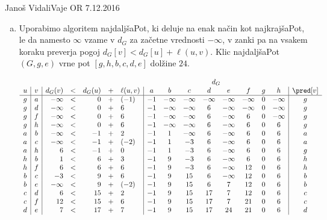 \begin{naloga}{Janoš Vidali}{Vaje OR 7.12.2016}
\begin{odgovor}
\begin{enumerate}[(a)]
\item Uporabimo algoritem {\sc najdaljšaPot},
ki deluje na enak način kot {\sc najkrajšaPot},
le da namesto $\infty$ vzame v $d_G$ za začetne vrednosti $-\infty$,
v zanki pa na vsakem koraku preverja pogoj $d_G[v] < d_G[u] + \ell(u, v)$.
Klic {\sc najdaljšaPot}$(G, g, e)$ vrne pot $[g, h, b, c, d, e]$ dolžine $24$.

\begin{tabela}
$$
\begin{array}{c|c|rcrcl|cccccccc|c}
\multicolumn{7}{c}{} & \multicolumn{8}{c}{d_G} \\
u & v & d_G(v) &<& d_G(u) &+& \ell(u, v) & a & b & c & d & e & f & g & h & \pred[v] \\ \hline
g & a & -\infty &<& 0 &+& (-1) & -1 & -\infty & -\infty & -\infty & -\infty & -\infty & 0 & -\infty & g\\
g & d & -\infty &<& 0 &+& 6 & -1 & -\infty & -\infty & 6 & -\infty & -\infty & 0 & -\infty & g\\
g & f & -\infty &<& 0 &+& 6 & -1 & -\infty & -\infty & 6 & -\infty & 6 & 0 & -\infty & g\\
g & h & -\infty &<& 0 &+& 6 & -1 & -\infty & -\infty & 6 & -\infty & 6 & 0 & 6 & g\\
a & b & -\infty &<& -1 &+& 2 & -1 & 1 & -\infty & 6 & -\infty & 6 & 0 & 6 & a\\
a & c & -\infty &<& -1 &+& (-2) & -1 & 1 & -3 & 6 & -\infty & 6 & 0 & 6 & a\\
a & h & 6 &<& -1 &+& 0 & -1 & 1 & -3 & 6 & -\infty & 6 & 0 & 6 & g\\
h & b & 1 &<& 6 &+& 3 & -1 & 9 & -3 & 6 & -\infty & 6 & 0 & 6 & h\\
h & f & 6 &<& 6 &+& 6 & -1 & 9 & -3 & 6 & -\infty & 12 & 0 & 6 & h\\
b & c & -3 &<& 9 &+& 6 & -1 & 9 & 15 & 6 & -\infty & 12 & 0 & 6 & b\\
b & e & -\infty &<& 9 &+& (-2) & -1 & 9 & 15 & 6 & 7 & 12 & 0 & 6 & b\\
c & d & 6 &<& 15 &+& 2 & -1 & 9 & 15 & 17 & 7 & 12 & 0 & 6 & c\\
c & f & 12 &<& 15 &+& 6 & -1 & 9 & 15 & 17 & 7 & 21 & 0 & 6 & c\\
d & e & 7 &<& 17 &+& 7 & -1 & 9 & 15 & 17 & 24 & 21 & 0 & 6 & d
\end{array}
$$
\end{tabela}

\end{enumerate}

\end{odgovor}
\end{naloga}
